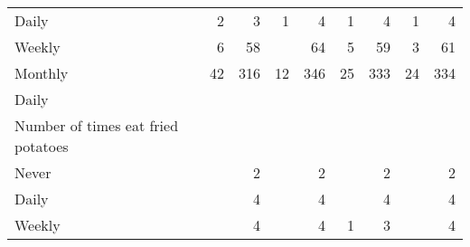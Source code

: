 \documentclass{article}
\begin{document}
\begin{tabular}{lllllllll}
\multicolumn{1}{l}{\hspace{5em}Daily} &
  \multicolumn{1}{|r}{2} &
  \multicolumn{1}{r}{3} &
  \multicolumn{1}{r}{1} &
  \multicolumn{1}{r}{4} &
  \multicolumn{1}{r}{1} &
  \multicolumn{1}{r}{4} &
  \multicolumn{1}{r}{1} &
  \multicolumn{1}{r}{4} \\
\multicolumn{1}{l}{\hspace{5em}Weekly} &
  \multicolumn{1}{|r}{6} &
  \multicolumn{1}{r}{58} &
  \multicolumn{1}{r}{} &
  \multicolumn{1}{r}{64} &
  \multicolumn{1}{r}{5} &
  \multicolumn{1}{r}{59} &
  \multicolumn{1}{r}{3} &
  \multicolumn{1}{r}{61} \\
\multicolumn{1}{l}{\hspace{5em}Monthly} &
  \multicolumn{1}{|r}{42} &
  \multicolumn{1}{r}{316} &
  \multicolumn{1}{r}{12} &
  \multicolumn{1}{r}{346} &
  \multicolumn{1}{r}{25} &
  \multicolumn{1}{r}{333} &
  \multicolumn{1}{r}{24} &
  \multicolumn{1}{r}{334} \\
\multicolumn{1}{l}{\hspace{3em}Daily} &
  \multicolumn{1}{|r}{} &
  \multicolumn{1}{r}{} &
  \multicolumn{1}{r}{} &
  \multicolumn{1}{r}{} &
  \multicolumn{1}{r}{} &
  \multicolumn{1}{r}{} &
  \multicolumn{1}{r}{} &
  \multicolumn{1}{r}{} \\
\multicolumn{1}{l}{\hspace{4em}Number of times eat fried potatoes} &
  \multicolumn{1}{|r}{} &
  \multicolumn{1}{r}{} &
  \multicolumn{1}{r}{} &
  \multicolumn{1}{r}{} &
  \multicolumn{1}{r}{} &
  \multicolumn{1}{r}{} &
  \multicolumn{1}{r}{} &
  \multicolumn{1}{r}{} \\
\multicolumn{1}{l}{\hspace{5em}Never} &
  \multicolumn{1}{|r}{} &
  \multicolumn{1}{r}{2} &
  \multicolumn{1}{r}{} &
  \multicolumn{1}{r}{2} &
  \multicolumn{1}{r}{} &
  \multicolumn{1}{r}{2} &
  \multicolumn{1}{r}{} &
  \multicolumn{1}{r}{2} \\
\multicolumn{1}{l}{\hspace{5em}Daily} &
  \multicolumn{1}{|r}{} &
  \multicolumn{1}{r}{4} &
  \multicolumn{1}{r}{} &
  \multicolumn{1}{r}{4} &
  \multicolumn{1}{r}{} &
  \multicolumn{1}{r}{4} &
  \multicolumn{1}{r}{} &
  \multicolumn{1}{r}{4} \\
\multicolumn{1}{l}{\hspace{5em}Weekly} &
  \multicolumn{1}{|r}{} &
  \multicolumn{1}{r}{4} &
  \multicolumn{1}{r}{} &
  \multicolumn{1}{r}{4} &
  \multicolumn{1}{r}{1} &
  \multicolumn{1}{r}{3} &
  \multicolumn{1}{r}{} &
  \multicolumn{1}{r}{4} \\

\end{tabular}
\end{document}
